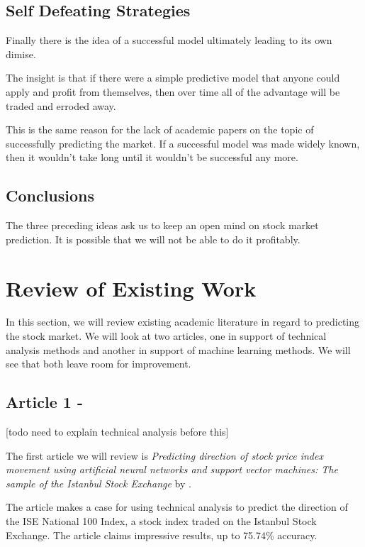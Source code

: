 \documentclass{report}
\begin{document}
\section{Self Defeating Strategies}

Finally there is the idea of a successful model ultimately leading to its own dimise. 

The insight is that if there were a simple predictive model that anyone could apply and profit from themselves, then over time all of the advantage will be traded and erroded away.

This is the same reason for the lack of academic papers on the topic of successfully predicting the market. If a successful model was made widely known, then it wouldn't take long until it wouldn't be successful any more.

\section{Conclusions}

The three preceding ideas ask us to keep an open mind on stock market prediction. It is possible that we will not be able to do it profitably.

\chapter{Review of Existing Work}

In this section, we will review existing academic literature in regard to predicting the stock market. We will look at two articles, one in support of technical analysis methods and another in support of machine learning methods. We will see that both leave room for improvement.

\section{Article 1 - \citet{kara2011predicting}} 

[todo need to explain technical analysis before this]

The first article we will review is \textit{Predicting direction of stock price index movement using artificial neural networks and support vector machines: The sample of the Istanbul Stock Exchange} by \citet{kara2011predicting}. 

The article makes a case for using technical analysis to predict the direction of the ISE National 100 Index, a stock index traded on the Istanbul Stock Exchange. The article claims impressive results, up to 75.74\% accuracy.
\end{document}

